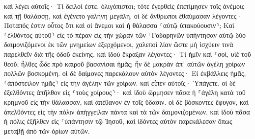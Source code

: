 \documentclass[twoside, 9pt]{extreport}
\begin{document}
καὶ λέγει αὐτοῖς· Τί δειλοί ἐστε, ὀλιγόπιστοι; τότε ἐγερθεὶς ἐπετίμησεν τοῖς ἀνέμοις καὶ τῇ θαλάσσῃ, καὶ ἐγένετο γαλήνη μεγάλη. 
οἱ δὲ ἄνθρωποι ἐθαύμασαν λέγοντες· Ποταπός ἐστιν οὗτος ὅτι καὶ οἱ ἄνεμοι καὶ ἡ θάλασσα ⸂αὐτῷ ὑπακούουσιν⸃; 
Καὶ ⸂ἐλθόντος αὐτοῦ⸃ εἰς τὸ πέραν εἰς τὴν χώραν τῶν ⸀Γαδαρηνῶν ὑπήντησαν αὐτῷ δύο δαιμονιζόμενοι ἐκ τῶν μνημείων ἐξερχόμενοι, χαλεποὶ λίαν ὥστε μὴ ἰσχύειν τινὰ παρελθεῖν διὰ τῆς ὁδοῦ ἐκείνης. 
καὶ ἰδοὺ ἔκραξαν λέγοντες· Τί ἡμῖν καὶ ⸀σοί, υἱὲ τοῦ θεοῦ; ἦλθες ὧδε πρὸ καιροῦ βασανίσαι ἡμᾶς; 
ἦν δὲ μακρὰν ἀπ᾽ αὐτῶν ἀγέλη χοίρων πολλῶν βοσκομένη. 
οἱ δὲ δαίμονες παρεκάλουν αὐτὸν λέγοντες· Εἰ ἐκβάλλεις ἡμᾶς, ⸂ἀπόστειλον ἡμᾶς⸃ εἰς τὴν ἀγέλην τῶν χοίρων. 
καὶ εἶπεν αὐτοῖς· Ὑπάγετε. οἱ δὲ ἐξελθόντες ἀπῆλθον εἰς ⸂τοὺς χοίρους⸃· καὶ ἰδοὺ ὥρμησεν πᾶσα ἡ ⸀ἀγέλη κατὰ τοῦ κρημνοῦ εἰς τὴν θάλασσαν, καὶ ἀπέθανον ἐν τοῖς ὕδασιν. 
οἱ δὲ βόσκοντες ἔφυγον, καὶ ἀπελθόντες εἰς τὴν πόλιν ἀπήγγειλαν πάντα καὶ τὰ τῶν δαιμονιζομένων. 
καὶ ἰδοὺ πᾶσα ἡ πόλις ἐξῆλθεν εἰς ⸀ὑπάντησιν τῷ Ἰησοῦ, καὶ ἰδόντες αὐτὸν παρεκάλεσαν ὅπως μεταβῇ ἀπὸ τῶν ὁρίων αὐτῶν. 
\end{document}
